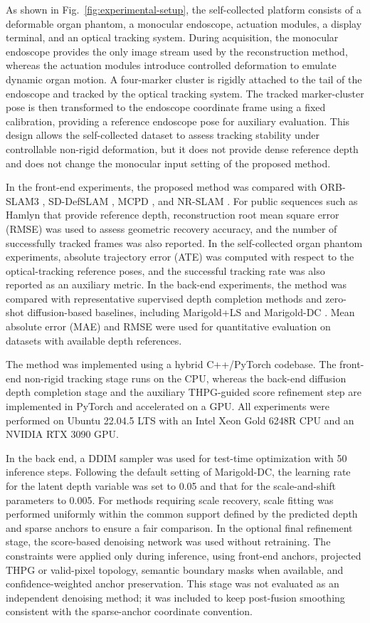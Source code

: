 \documentclass[pdflatex,sn-mathphys-num]{sn-jnl}
\begin{document}
As shown in Fig.~\ref{fig:experimental-setup}, the self-collected platform consists of a deformable organ phantom, a monocular endoscope, actuation modules, a display terminal, and an optical tracking system. During acquisition, the monocular endoscope provides the only image stream used by the reconstruction method, whereas the actuation modules introduce controlled deformation to emulate dynamic organ motion. A four-marker cluster is rigidly attached to the tail of the endoscope and tracked by the optical tracking system. The tracked marker-cluster pose is then transformed to the endoscope coordinate frame using a fixed calibration, providing a reference endoscope pose for auxiliary evaluation. This design allows the self-collected dataset to assess tracking stability under controllable non-rigid deformation, but it does not provide dense reference depth and does not change the monocular input setting of the proposed method.

In the front-end experiments, the proposed method was compared with ORB-SLAM3 \cite{bib4}, SD-DefSLAM \cite{bib6}, MCPD \cite{bib8}, and NR-SLAM \cite{bib9}. For public sequences such as Hamlyn that provide reference depth, reconstruction root mean square error (RMSE) was used to assess geometric recovery accuracy, and the number of successfully tracked frames was also reported. In the self-collected organ phantom experiments, absolute trajectory error (ATE) was computed with respect to the optical-tracking reference poses, and the successful tracking rate was also reported as an auxiliary metric. In the back-end experiments, the method was compared with representative supervised depth completion methods and zero-shot diffusion-based baselines, including Marigold+LS and Marigold-DC \cite{bib13,bib16,bib17,bib20,bib27}. Mean absolute error (MAE) and RMSE were used for quantitative evaluation on datasets with available depth references.

The method was implemented using a hybrid C++/PyTorch codebase. The front-end non-rigid tracking stage runs on the CPU, whereas the back-end diffusion depth completion stage and the auxiliary THPG-guided score refinement step are implemented in PyTorch and accelerated on a GPU. All experiments were performed on Ubuntu 22.04.5 LTS with an Intel Xeon Gold 6248R CPU and an NVIDIA RTX 3090 GPU.

In the back end, a DDIM sampler was used for test-time optimization with 50 inference steps. Following the default setting of Marigold-DC, the learning rate for the latent depth variable was set to 0.05 and that for the scale-and-shift parameters to 0.005. For methods requiring scale recovery, scale fitting was performed uniformly within the common support defined by the predicted depth and sparse anchors to ensure a fair comparison. In the optional final refinement stage, the score-based denoising network was used without retraining. The constraints were applied only during inference, using front-end anchors, projected THPG or valid-pixel topology, semantic boundary masks when available, and confidence-weighted anchor preservation. This stage was not evaluated as an independent denoising method; it was included to keep post-fusion smoothing consistent with the sparse-anchor coordinate convention.
\end{document}
